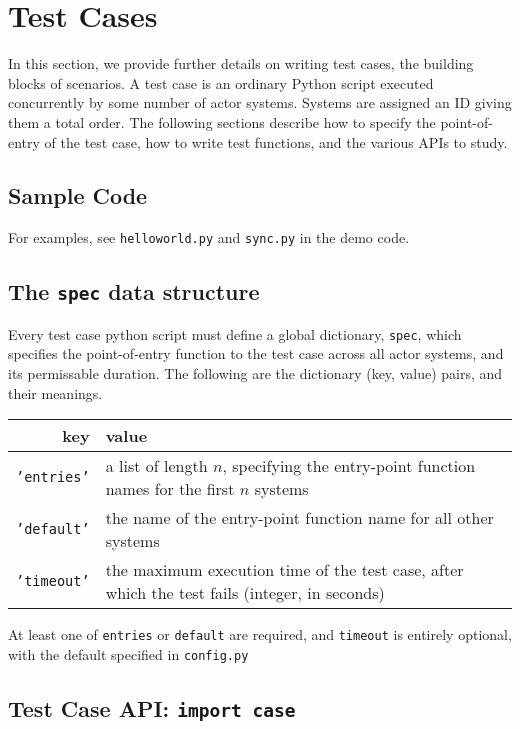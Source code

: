 \section{Test Cases}
In this section, we provide further details on writing test cases, the building
blocks of scenarios. A test case is an ordinary Python script executed
concurrently by some number of actor systems. Systems are assigned an ID giving
them a total order. The following sections describe how to specify the
point-of-entry of the test case, how to write test functions, and the various
APIs to study.

\subsection{Sample Code}
For examples, see {\tt helloworld.py} and {\tt sync.py} in the demo code.

\subsection{The {\tt spec} data structure}
Every test case python script must define a global dictionary, {\tt spec}, which
specifies the point-of-entry function to the test case across all actor systems,
and its permissable duration.  The following are the dictionary (key, value)
pairs, and their meanings.

\begin{center}
\begin{tabular}{ r | p{8cm} }
    key           & value \\
    \hline
    {\tt 'entries'} 
        & a list of length $n$, specifying the entry-point function names for
          the first $n$ systems \\
    {\tt 'default'}
        & the name of the entry-point function name for all other systems \\
    {\tt 'timeout'}
        & the maximum execution time of the test case, after which the test
          fails (integer, in seconds) \\
\end{tabular}
\end{center}

At least one of {\tt entries} or {\tt default} are required, and {\tt timeout}
is entirely optional, with the default specified in {\tt config.py}

\subsection{Test Case API: {\tt import case}} 

